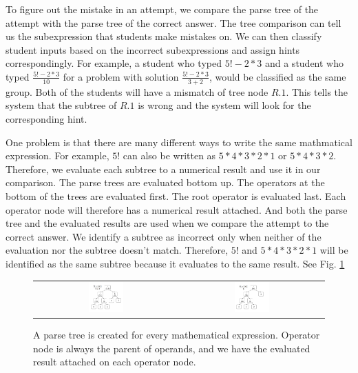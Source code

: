 \documentclass{sigchi/sigchi}
\begin{document}
To figure out the mistake in an attempt, we compare the parse tree of the attempt with the parse tree of the correct answer. The tree comparison can tell us the subexpression that students make mistakes on. We can then classify student inputs based on the incorrect subexpressions and assign hints correspondingly. For example, a student who typed $5!-2*3$ and a student who typed $\frac{5!-2*3}{10}$ for a problem with solution $\frac{5!-2*3}{3+2}$, would be classified as the same group. Both of the students will have a mismatch of tree node $R.1$. This tells the system that the subtree of $R.1$ is wrong and the system will look for the corresponding hint.

One problem is that there are many different ways to write the same mathmatical expression. For example, $5!$ can also be written as $5*4*3*2*1$ or $5*4*3*2$. Therefore, we evaluate each subtree to a numerical result and use it in our comparison. The parse trees are evaluated bottom up. The operators at the bottom of the trees are evaluated first. The root operator is evaluated last. Each operator node will therefore has a numerical result attached. And both the parse tree and the evaluated results are used when we compare the attempt to the correct answer. We identify a subtree as incorrect only when neither of the evaluation nor the subtree doesn't match. Therefore, $5!$ and $5*4*3*2*1$ will be identified as the same subtree because it evaluates to the same result. See Fig. \ref{fig:parse_tree}

\begin{figure}[ht]
  \centering
   \begin{tabular}{c c}
		\includegraphics[width=0.25\textwidth]{image/ParseTrees1.png} &
		\includegraphics[width=0.25\textwidth]{image/ParseTrees2.png}
	\end{tabular}
   \caption{A parse tree is created for every mathematical expression. Operator node is always the parent of operands, and we have the evaluated result attached on each operator node.}
   \label{fig:parse_tree}
\end{figure}
\end{document}
